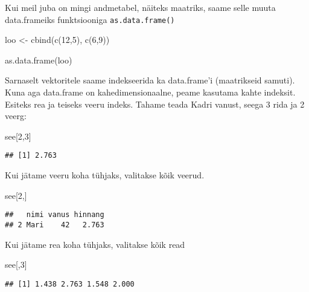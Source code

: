 \documentclass[
]{book}
\newenvironment{Shaded}{\begin{snugshade}}{\end{snugshade}}
\newcommand{\DecValTok}[1]{\textcolor[rgb]{0.00,0.00,0.81}{#1}}
\newcommand{\FunctionTok}[1]{\textcolor[rgb]{0.00,0.00,0.00}{#1}}
\newcommand{\NormalTok}[1]{#1}
\newcommand{\OtherTok}[1]{\textcolor[rgb]{0.56,0.35,0.01}{#1}}
\begin{document}
Kui meil juba on mingi andmetabel, näiteks maatriks, saame selle muuta data.frameiks funktsiooniga \texttt{as.data.frame()}

\begin{Shaded}
\begin{Highlighting}[]
\NormalTok{loo }\OtherTok{\textless{}{-}} \FunctionTok{cbind}\NormalTok{(}\FunctionTok{c}\NormalTok{(}\DecValTok{12}\NormalTok{,}\DecValTok{5}\NormalTok{), }\FunctionTok{c}\NormalTok{(}\DecValTok{6}\NormalTok{,}\DecValTok{9}\NormalTok{))}

\FunctionTok{as.data.frame}\NormalTok{(loo)}
\end{Highlighting}
\end{Shaded}

Sarnaselt vektoritele saame indekseerida ka data.frame'i (maatrikseid samuti). Kuna aga data.frame on kahedimensionaalne, peame kasutama kahte indeksit. Esiteks rea ja teiseks veeru indeks.
Tahame teada Kadri vanust, seega 3 rida ja 2 veerg:

\begin{Shaded}
\begin{Highlighting}[]
\NormalTok{see[}\DecValTok{2}\NormalTok{,}\DecValTok{3}\NormalTok{]}
\end{Highlighting}
\end{Shaded}

\begin{verbatim}
## [1] 2.763
\end{verbatim}

Kui jätame veeru koha tühjaks, valitakse kõik veerud.

\begin{Shaded}
\begin{Highlighting}[]
\NormalTok{see[}\DecValTok{2}\NormalTok{,]}
\end{Highlighting}
\end{Shaded}

\begin{verbatim}
##   nimi vanus hinnang
## 2 Mari    42   2.763
\end{verbatim}

Kui jätame rea koha tühjaks, valitakse kõik read

\begin{Shaded}
\begin{Highlighting}[]
\NormalTok{see[,}\DecValTok{3}\NormalTok{]}
\end{Highlighting}
\end{Shaded}

\begin{verbatim}
## [1] 1.438 2.763 1.548 2.000
\end{verbatim}
\end{document}
